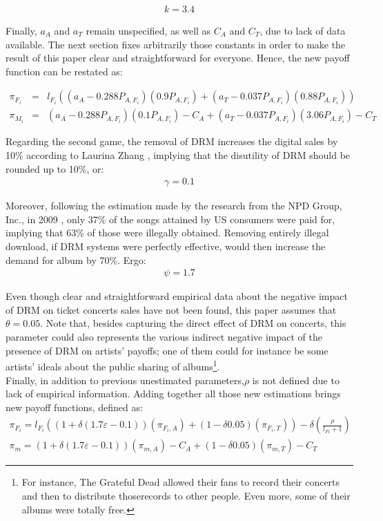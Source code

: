 \documentclass[a4paper,12pt]{article}
\numberwithin{equation}{section}
\begin{document}
\begin{eqnarray*}
k=3.4
\end{eqnarray*}

Finally, $a_{A}$ and $a_{T}$ remain unspecified, as well as $C_{A}$ and
$C_{T}$, due to lack of data available. The next section fixes arbitrarily
those constants in order to make the result of this paper clear and
straightforward for everyone. Hence, the new payoff function can be
restated as:

\begin{eqnarray*}
\pi_{F_{i}} & = & l_{F_{i}}((a_{A}-0.288P_{A,F_{i}})(0.9P_{A,F_{i}})+(a_{T}-0.037P_{A,F_{i}})(0.88P_{A,F_{i}}))\\
\pi_{M_i} & = & (a_{A}-0.288P_{A,F_{i}})(0.1P_{A,F_{i}})-C_{A}+(a_{T}-0.037P_{A,F_{i}})(3.06P_{A,F_{i}})-C_{T}
\end{eqnarray*}

Regarding the second game, the removal of DRM increases the digital
sales by 10\% according to Laurina Zhang \cite{zhang2014}, implying
that the disutility of DRM should be rounded up to 10\%, or:
\begin{eqnarray*}
\gamma=0.1
\end{eqnarray*}

Moreover, following the estimation made by the research from the NPD
Group, Inc., in 2009 \cite{npd2009}, only 37\% of the songs attained
by US consumers were paid for, implying that 63\% of those were illegally
obtained. Removing entirely illegal download, if DRM systems were
perfectly effective, would then increase the demand for album by 70\%.
Ergo:
\begin{eqnarray*}
\psi=1.7
\end{eqnarray*}

Even though clear and straightforward empirical data about the negative
impact of DRM on ticket concerts sales have not been found, this paper
assumes that $\theta=0.05$. Note that, besides capturing the direct
effect of DRM on concerts, this parameter could also represents the
various indirect negative impact of the presence of DRM on artists’
payoffs; one of them could for instance be some artists’ ideals about
the public sharing of albums\footnote{
For instance, The Grateful Dead allowed their fans to record their
concerts and then to distribute thoserecords to other people. Even
more, some of their albums were totally free.
}.\\

Finally, in addition to previous unestimated parameters,$\rho$ is
not defined due to lack of empirical information. Adding together
all those new estimations brings new payoff functions, defined as:
\begin{eqnarray*}
\pi_{F_{i}}=l_{F_{i}}((1+\delta(1.7\varepsilon-0.1))(\pi_{F_{i},A})+(1-\delta0.05)(\pi_{F_{i},T}))-\delta(\frac{\rho}{l_{Fi}+1})\\
\pi_{m}=(1+\delta(1.7\varepsilon-0.1))(\pi_{m,A})-C_{A}+(1-\delta0.05)(\pi_{m,T})-C_{T}
\end{eqnarray*}
\end{document}
